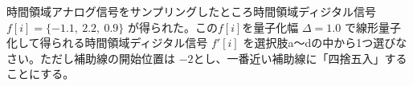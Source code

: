 時間領域アナログ信号をサンプリングしたところ時間領域ディジタル信号 $f[i] = \{-1.1,\ 2.2,\ 0.9 \}$ が得られた。この$f[i]$を量子化幅 $\Delta = 1.0$ で線形量子化して得られる時間領域ディジタル信号 $f'[i]$ を選択肢a〜dの中から1つ選びなさい。ただし補助線の開始位置は $-2$とし、一番近い補助線に「四捨五入」することにする。
